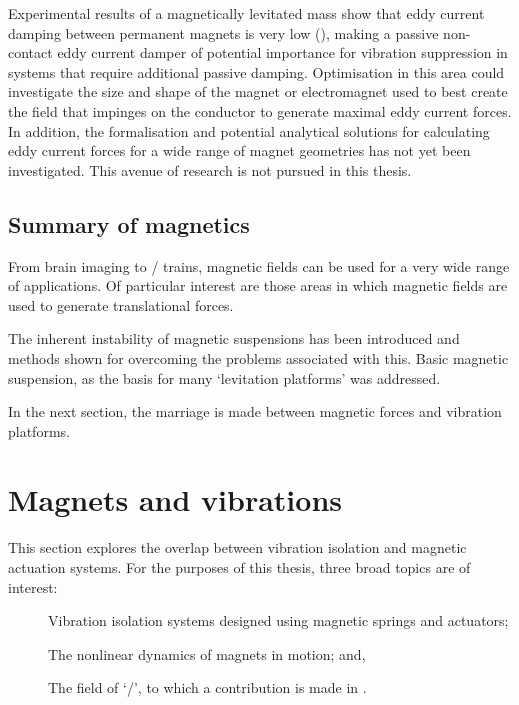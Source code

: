 \documentclass[11pt,a4paper]{memoir}
\begin{document}
Experimental results of a magnetically levitated mass show that eddy current damping between permanent magnets is very low (), making a passive non-contact eddy current damper of potential importance for vibration suppression in systems that require additional passive damping.
Optimisation in this area could investigate the size and shape of the magnet or electromagnet used to best create the field that impinges on the conductor to generate maximal eddy current forces.
In addition, the formalisation and potential analytical solutions for calculating eddy current forces for a wide range of magnet geometries has not yet been investigated.
This avenue of research is not pursued in this thesis.


\subsection{Summary of magnetics}

From brain imaging to \maglev/ trains, magnetic fields can be used for a very wide range of applications. Of particular interest are those areas in which magnetic fields are used to generate translational forces.

The inherent instability of magnetic suspensions has been introduced and methods shown for overcoming the problems associated with this.
Basic magnetic suspension, as the basis for many `levitation platforms' was addressed.

In the next section, the marriage is made between magnetic forces and vibration platforms.


\section{Magnets and vibrations}

This section explores the overlap between vibration isolation and magnetic actuation systems.
For the purposes of this thesis, three broad topics are of interest:
\begin{description}
\item[]
Vibration isolation systems designed using magnetic springs and actuators;
\item[]
The nonlinear dynamics of magnets in motion; and,
\item[]
The field of `\qzs/', to which a contribution is made in .
\end{description}
\end{document}
